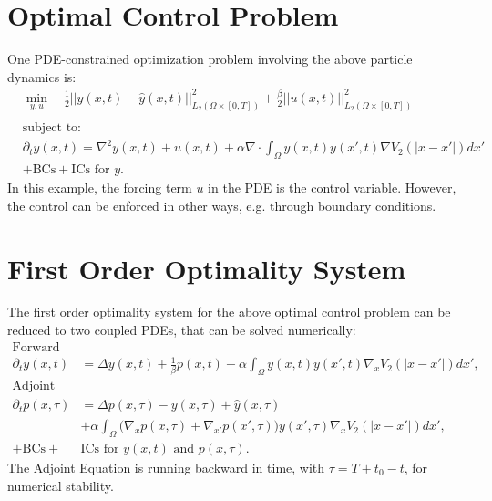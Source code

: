 \documentclass[a0,portrait]{a0poster}
\newcommand{\Sta}{y}
\newcommand{\Adj}{p}
\newcommand{\Con}{u}
\begin{document}
\begin{multicols}{2}
\section*{Optimal Control Problem}
One PDE-constrained optimization problem involving the above particle dynamics is:
\begin{align*}
&\min_{\Sta,u} \quad \frac{1}{2}||{\Sta(x,t)- \hat{\Sta}(x,t)}||_{L_2(\Omega \times [0,T])}^2 + \frac{\beta}{2} ||{\Con}(x,t)||_{L_2(\Omega \times [0,T])}^2\\
\\
&\text{subject to:}
\\
&\partial_t \Sta(x,t) =\nabla^2 \Sta(x,t) +\Con(x,t) + \alpha \nabla \cdot\int_\Omega \Sta(x,t) \Sta(x',t) \nabla V_2(|x-x'|)dx' \\
&+\text{BCs} + \text{ICs for } \Sta.
\end{align*}
 In this example, the forcing term $\Con$ in the PDE is the control variable. However, the control can be enforced in other ways, e.g. through boundary conditions.
\section*{First Order Optimality System}
 The first order optimality system for the above optimal control problem can be reduced to two coupled PDEs, that can be solved numerically: 
\begin{align*}
\text{Forward Problem}\\
\partial_t \Sta(x,t) &= \Delta \Sta(x,t) + \frac{1}{\beta}\Adj(x,t) +\alpha\int_\Omega\Sta(x,t) \Sta(x',t) \nabla_x V_2(|x-x'|)dx',\\
\text{Adjoint Equation}\\
\partial_t \Adj(x,\tau) &=  \Delta \Adj(x,\tau) -\Sta(x,\tau) +\hat{\Sta}(x,\tau) \phantom{\int} \\
&+\alpha\int_\Omega \bigg( \nabla_x \Adj(x,\tau) + \nabla_{x'} \Adj(x',\tau) \bigg) \Sta(x',\tau) \nabla_x V_2(|x-x'|)dx',\\
+\text{BCs} + &\text{ICs for } \Sta(x,t) \text{ and } \Adj(x,\tau).
\end{align*}
The Adjoint Equation is running backward in time, with $\tau = T+t_0 -t$, for numerical stability.

\end{multicols}
\end{document}
